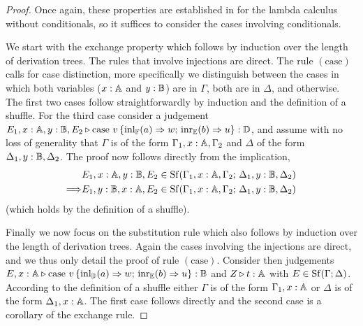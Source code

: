 \begin{proof}
  Once again, these properties are established in \cite[Theorem 2.1]{dahlqvist2022syntactic} for the lambda calculus without conditionals, so it suffices to consider the cases involving conditionals.

  We start with the exchange property which follows by induction over the length
of derivation trees. The rules that involve injections are direct.  The rule
$(\text{case})$ calls for case distinction, more specifically we  distinguish
between the cases in which both variables ($x : \mathbb{A}$ and $y : \mathbb{B}$) are
in $\Gamma$, both are in $\Delta$, and otherwise. The first two cases follow
straightforwardly by induction and the definition of a shuffle. For the third
case consider a judgement $E_1,x : \mathbb{A}, y : \mathbb{B}, E_2 \triangleright \text{case }
v\, \{\mathrm{inl}_{\mathbb{F}}(a) \Rightarrow w ; \, \mathrm{inr}_{\mathbb{E}}(b) \Rightarrow u \}:
\mathbb{D}$, and assume with no loss of generality that $\Gamma$ is of the form
$\Gamma_1, x : \mathbb{A}, \Gamma_2$ and $\Delta$ of the form $\Delta_1, y :
\mathbb{B}, \Delta_2$. The proof now follows directly from the implication,
\begin{align*}
        & E_1, x : \mathbb{A}, y : \mathbb{B}, E_2 \in \mathrm{Sf}(\Gamma_1, x : \mathbb{A}, \Gamma_2 ; \,
        \Delta_1, y : \mathbb{B}, \Delta_2) \\
        \Longrightarrow &
        E_1, y : \mathbb{B}, x : \mathbb{A}, E_2 \in \mathrm{Sf}(\Gamma_1, x : \mathbb{A}, \Gamma_2 ; \,
        \Delta_1, y : \mathbb{B}, \Delta_2)
\end{align*}
(which holds by the definition of a shuffle).

Finally we now focus on the substitution rule which also follows by induction over the
length of derivation trees. Again the cases involving the injections are direct,
and we thus only detail the proof of rule $(\text{case})$. Consider then
judgements $E,x : \mathbb{A} \triangleright \text{case } v\, \{\mathrm{inl}_{\mathbb{D}}(a) \Rightarrow
w ; \, \mathrm{inr}_{\mathbb{E}}(b) \Rightarrow u \}: \mathbb{B}$ and
$Z \triangleright t : \mathbb{A}$ with $E \in \mathrm{Sf}(\Gamma; \Delta)$. According to the definition
of a shuffle either $\Gamma$ is of the form $\Gamma_1, x: \mathbb{A}$ or $\Delta$ is
of the form $\Delta_1, x : \mathbb{A}$. The first case follows directly and the second case
is a corollary of the exchange rule.
\end{proof}
 


